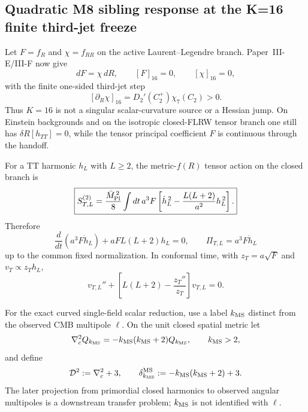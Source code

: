 \documentclass[12pt,a4paper]{article}
\begin{document}
\subsection{Quadratic M8 sibling response at the K=16 finite third-jet freeze}
\label{p8:sec:v189-k16-quadratic-sibling-response}
Let \(F=f_R\) and \(\chi=f_{RR}\) on the active Laurent--Legendre branch.
Paper~III-E/III-F now give
\[
 \boxed{dF=\chi\,dR,\qquad [F]_{16}=0,\qquad[\chi]_{16}=0,}
\]
with the finite one-sided third-jet step
\[
 \boxed{[\partial_R\chi]_{16}=D_2'(C_2^+)\chi_7(C_2)>0.}
\]
Thus $K=16$ is not a singular scalar-curvature source or a Hessian jump.  On Einstein
backgrounds and on the isotropic closed-FLRW tensor branch one still has
\(\delta R[h_{TT}]=0\), while the tensor principal coefficient \(F\) is
continuous through the handoff.

\begin{theorem}
\label{p8:thm:v189-closed-tensor-kernel}
For a TT harmonic $h_L$ with $L\ge2$, the metric-$f(R)$ tensor action on the
closed branch is
\[
 \boxed{S_{T,L}^{(2)}=\frac{\bar M_{\rm Pl}^{\,2}}8
 \int dt\,a^3F\left[\dot h_L^{\,2}
 -\frac{L(L+2)}{a^2}h_L^{\,2}\right].}
\]
Therefore
\[
 \frac{d}{dt}(a^3F\dot h_L)+aF L(L+2)h_L=0,
 \qquad
 \Pi_{T,L}=a^3F\dot h_L
\]
up to the common fixed normalization.  In conformal time, with
$z_T=a\sqrt F$ and $v_T\propto z_T h_L$,
\[
 v_{T,L}''+\left[L(L+2)-\frac{z_T''}{z_T}\right]v_{T,L}=0.
\]
\end{theorem}

\begin{definition}
\label{p8:def:v189-closed-ms-index}
For the exact curved single-field scalar reduction, use a label
$k_{\rm MS}$ distinct from the observed CMB multipole $\ell$.  On the unit
closed spatial metric let
\[
 \nabla_c^2Q_{k_{\rm MS}}=-k_{\rm MS}(k_{\rm MS}+2)Q_{k_{\rm MS}},
 \qquad k_{\rm MS}>2,
\]
and define
\[
 \mathcal D^2:=\nabla_c^2+3,
 \qquad
 \delta_{k_{\rm MS}}^{\rm MS}:=-k_{\rm MS}(k_{\rm MS}+2)+3.
\]
The later projection from primordial closed harmonics to observed angular
multipoles is a downstream transfer problem; $k_{\rm MS}$ is not identified
with $\ell$.
\end{definition}
\end{document}
